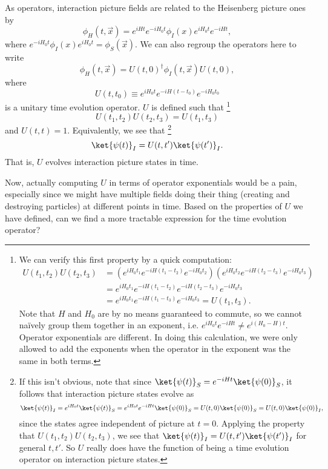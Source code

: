 As operators, interaction picture fields are related to the Heisenberg picture ones by
$$\phi_H(t,\vec x)=e^{iHt} e^{-iH_0t} \phi_I(x) e^{iH_0t} e^{-iHt},$$
where $e^{-iH_0t} \phi_I(x) e^{iH_0t}=\phi_S(\vec x).$ We can also regroup the operators here to write
$$\phi_H(t,\vec x) = U(t,0)^\dagger \phi_I(t,\vec x) U(t,0),$$
where 
\begin{equation}
    U(t,t_0)\equiv e^{iH_0t} e^{-iH(t-t_0)}e^{-iH_0t_0}%
\end{equation} is a unitary time evolution operator. $U$ is defined such that%
    \footnote{We can verify this first property by a quick computation:
    \begin{align*}
        U(t_1,t_2)U(t_2,t_3)&=\left(e^{iH_0 t_1}e^{-iH(t_1-t_2)}e^{-iH_0 t_2}\right)
        \left(e^{iH_0 t_2}e^{-iH(t_2-t_3)}e^{-iH_0 t_3}\right)\\
        &=e^{iH_0 t_1}e^{-iH(t_1-t_2)}e^{-iH(t_2-t_3)}e^{-iH_0 t_3}\\
        &=e^{iH_0 t_1}e^{-iH(t_1-t_3)}e^{-iH_0 t_3} = U(t_1,t_3).
    \end{align*}
    Note that $H$ and $H_0$ are by no means guaranteed to commute, so we cannot na\"ively group them together in an exponent, i.e. $e^{iH_0t}e^{-iHt}\neq e^{i(H_0-H)t}$. Operator exponentials are different. In doing this calculation, we were only allowed to add the exponents when the operator in the exponent was the same in both terms.}
%
$$U(t_1,t_2)U(t_2,t_3)=U(t_1,t_3)$$
%
and $U(t,t)=1$. Equivalently, we see that%
    \footnote{If this isn't obvious, note that since $\ket{\psi(t)}_S=e^{-iHt}\ket{\psi(0)}_S$, it follows that interaction picture states evolve as
    \begin{equation*}
        \ket{\psi(t)}_I=e^{iH_0t}\ket{\psi(t)}_S=e^{iH_0t}e^{-iHt}\ket{\psi(0)}_S=U(t,0)\ket{\psi(0)}_S=U(t,0)\ket{\psi(0)}_I,
    \end{equation*}
    since the states agree independent of picture at $t=0$. Applying the property that $U(t_1,t_2)U(t_2,t_3)$, we see that $\ket{\psi(t)}_I=U(t,t')\ket{\psi(t')}_I$ for general $t,t'$. So $U$ really does have the function of being a time evolution operator on interaction picture states. }
%
$$\ket{\psi(t)}_I=U(t,t')\ket{\psi(t')}_I.$$ 
%
That is, $U$ evolves interaction picture states in time.

Now, actually computing $U$ in terms of operator exponentials would be a pain, especially since we might have multiple fields doing their thing (creating and destroying particles) at different points in time. Based on the properties of $U$ we have defined, can we find a more tractable expression for the time evolution operator? 

